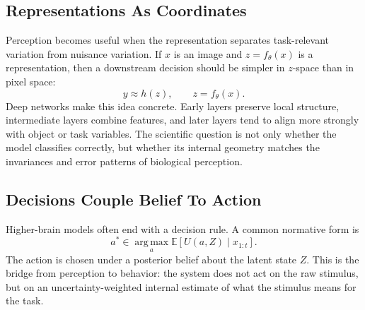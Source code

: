 \subsection{Representations As Coordinates}

Perception becomes useful when the representation separates task-relevant variation from nuisance variation. If \(x\) is an image and \(z=f_\theta(x)\) is a representation, then a downstream decision should be simpler in \(z\)-space than in pixel space:
\[
  y \approx h(z),
  \qquad
  z=f_\theta(x).
\]
Deep networks make this idea concrete. Early layers preserve local structure, intermediate layers combine features, and later layers tend to align more strongly with object or task variables. The scientific question is not only whether the model classifies correctly, but whether its internal geometry matches the invariances and error patterns of biological perception.

\subsection{Decisions Couple Belief To Action}

Higher-brain models often end with a decision rule. A common normative form is
\[
  a^\ast
  \in
  \operatorname*{arg\,max}_a
  \mathbb{E}\!\left[U(a,Z)\mid x_{1:t}\right].
\]
The action is chosen under a posterior belief about the latent state \(Z\). This is the bridge from perception to behavior: the system does not act on the raw stimulus, but on an uncertainty-weighted internal estimate of what the stimulus means for the task.
